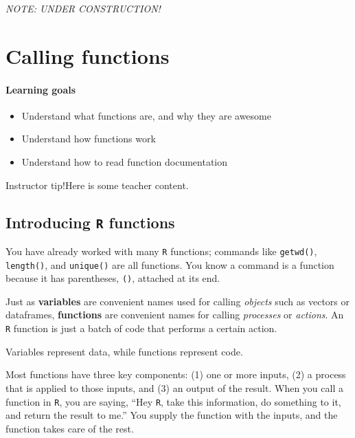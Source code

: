 \documentclass[
]{book}
\providecommand{\tightlist}{%
  \setlength{\itemsep}{0pt}\setlength{\parskip}{0pt}}
\begin{document}
\emph{NOTE: UNDER CONSTRUCTION!}

\hypertarget{calling-functions}{%
\chapter{Calling functions}\label{calling-functions}}

\hypertarget{learning-goals-4}{%
\subsubsection*{Learning goals}\label{learning-goals-4}}

\begin{itemize}
\tightlist
\item
  Understand what functions are, and why they are awesome
\item
  Understand how functions work
\item
  Understand how to read function documentation
\end{itemize}

Instructor tip!Here is some teacher content.

\hypertarget{introducing-r-functions}{%
\section*{\texorpdfstring{Introducing \texttt{R} functions}{Introducing R functions}}\label{introducing-r-functions}}

You have already worked with many \texttt{R} functions; commands like \texttt{getwd()}, \texttt{length()}, and \texttt{unique()} are all functions. You know a command is a function because it has parentheses, \texttt{()}, attached at its end.

Just as \textbf{variables} are convenient names used for calling \emph{objects} such as vectors or dataframes, \textbf{functions} are convenient names for calling \emph{processes} or \emph{actions}. An \texttt{R} function is just a batch of code that performs a certain action.

Variables represent data, while functions represent code.

Most functions have three key components: (1) one or more inputs, (2) a process that is applied to those inputs, and (3) an output of the result. When you call a function in \texttt{R}, you are saying, ``Hey \texttt{R}, take this information, do something to it, and return the result to me.'' You supply the function with the inputs, and the function takes care of the rest.
\end{document}
